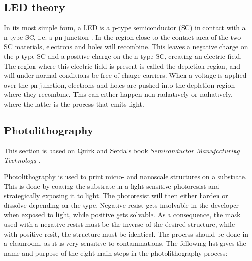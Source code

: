 
\subsection{LED theory}
\label{LEDtheory}

In its most simple form, a LED is a p-type semiconductor (SC) in contact with a n-type SC, i.e. a pn-junction \cite{streetman2015solid}.
In the region close to the contact area of the two SC materials, electrons and holes will recombine.
This leaves a negative charge on the p-type SC and a positive charge on the n-type SC, creating an electric field.
The region where this electric field is present is called the depletion region, and will under normal conditions be free of charge carriers.
When a voltage is applied over the pn-junction, electrons and holes are pushed into the depletion region where they recombine.
This can either happen non-radiatively or radiatively, where the latter is the process that emits light.




\subsection{Photolithography}
\label{photolithography}
This section is based on Quirk and Serda's book \textit{Semiconductor Manufacturing Technology} \cite{quirkSerda}.

Photolithography is used to print micro- and nanoscale structures on a substrate.
This is done by coating the substrate in a light-sensitive photoresist and strategically exposing it to light.
The photoresist will then either harden or dissolve depending on the type.
Negative resist gets insolvable in the developer when exposed to light, while positive gets solvable.
As a consequence, the mask used with a negative resist must be the inverse of the desired structure, while with positive resit, the structure must be identical.
The process should be done in a cleanroom, as it is very sensitive to contaminations.
The following list gives the name and purpose of the eight main steps in the photolithography process:

